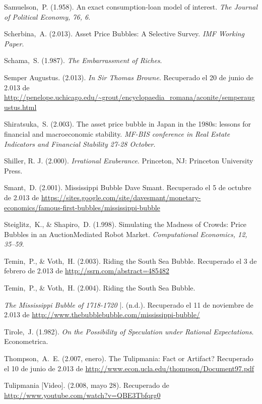 \begin{thebibliography}{11}
	\bibitem{}
		Samuelson, P. (1.958). An exact consumption-loan model of interest. \emph{The Journal of Political Economy, 76, 6}. 

	\bibitem{}
		Scherbina, A. (2.013). Asset Price Bubbles: A Selective Survey. \emph{IMF Working Paper}.  

	\bibitem{}
		Schama, S. (1.987). \emph{The Embarrassment of Riches}. 

	\bibitem{}
		Semper Augustus. (2.013). \emph{In Sir Thomas Browne}. Recuperado el 20 de junio de 2.013 de \url{http://penelope.uchicago.edu/~grout/encyclopaedia\_romana/aconite/semperaugustus.html}

	\bibitem{}
		Shiratsuka, S. (2.003). The asset price bubble in Japan in the 1980s: lessons for financial and macroeconomic stability. \emph{MF-BIS conference in Real Estate Indicators and Financial Stability 27-28 October}. 

	\bibitem{}
		Shiller, R. J. (2.000). \emph{Irrational Exuberance}. Princeton, NJ: Princeton University Press.

	\bibitem{}
		Smant, D. (2.001). Mississippi Bubble Dave Smant. Recuperado el 5 de octubre de 2.013 de \url{https://sites.google.com/site/davesmant/monetary-economics/famous-first-bubbles/mississippi-bubble}

	\bibitem{}
		Steiglitz, K., \& Shapiro, D. (1.998). Simulating the Madness of Crowds: Price Bubbles in an AuctionMediated Robot Market. \emph{Computational Economics, 12, 35–59}. 

	\bibitem{}
		Temin, P., \& Voth, H. (2.003). Riding the South Sea Bubble. Recuperado el 3 de febrero de 2.013 de \url{http://ssrn.com/abstract=485482}

	\bibitem{}
		Temin, P., \& Voth, H. (2.004). Riding the South Sea Bubble. 	

	\bibitem{}
		\emph{The Mississippi Bubble of 1718-1720} |. (n.d.). Recuperado el 11 de noviembre de 2.013 de \url{http://www.thebubblebubble.com/mississippi-bubble/}

	\bibitem{}
		Tirole, J. (1.982). \emph{On the Possibility of Speculation under Rational Expectations}. Econometrica. 
	

	\bibitem{}
		Thompson, A. E. (2.007, enero). The Tulipmania: Fact or Artifact? Recuperado el 10 de junio de 2.013 de \url{http://www.econ.ucla.edu/thompson/Document97.pdf}

	\bibitem{}
		Tulipmania [Video]. (2.008, mayo 28). Recuperado de \url{http://www.youtube.com/watch?v=QBE3Tbfqrg0}


\end{thebibliography}
